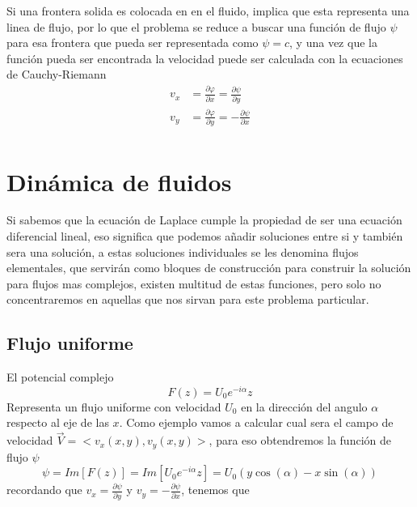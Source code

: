 \documentclass[12pt]{article}
\begin{document}

	Si una frontera solida es colocada en en el fluido, implica que esta representa una linea de flujo, por lo que el problema se reduce  a buscar una función de flujo $\psi$ para esa frontera que pueda ser representada como $\psi=c$, y una vez que la función pueda ser encontrada la velocidad puede ser calculada con la ecuaciones de Cauchy-Riemann
	\begin{equation}
		\begin{split}
			v_x &= \frac{\partial \varphi}{\partial x} = \frac{\partial \psi}{\partial y } \\
			v_y &= \frac{\partial \varphi}{\partial y} =- \frac{\partial \psi}{\partial x } \\
		\end{split}
	\end{equation}
	
\section{Dinámica de fluidos}
		Si sabemos que la ecuación de Laplace cumple la propiedad de ser una ecuación diferencial lineal, eso significa que podemos añadir soluciones entre si y también sera una solución, a estas soluciones individuales se les denomina flujos elementales, que servirán como bloques de construcción para construir la solución para flujos mas complejos, existen multitud de estas funciones, pero solo no concentraremos en aquellas que nos sirvan para este problema particular.
		\subsection{Flujo uniforme}
			El potencial complejo 
			\begin{equation}
				F(z) = U_0 e^{-i\alpha}z
			\end{equation}
			Representa un flujo uniforme con velocidad $U_0$ en la dirección del angulo $\alpha$ respecto al eje de las $x$.
			Como ejemplo vamos a calcular cual sera el campo de velocidad $\vec{V}=<v_x (x,y),v_y (x,y)>$, para eso obtendremos la función de flujo $\psi$
			\begin{equation}
				\psi = Im[F(z)] = Im[U_0 e^{-i\alpha}z] =	U_0(y \cos{\left(\alpha \right)}- x \sin{\left(\alpha \right)} )
			\end{equation}
			recordando que $v_x = \frac{\partial \psi}{\partial y}$ y $ v_y = -\frac{\partial \psi}{\partial x}$, tenemos que
			
\end{document}
